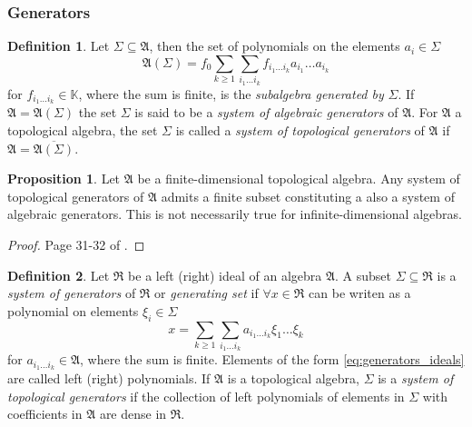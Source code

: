 \documentclass{article}
\theoremstyle{definition}
\newtheorem{definition}{Definition}
\newtheorem{proposition}{Proposition}
\begin{document}
\subsubsection{Generators}

\begin{definition}
    Let $\Sigma \subseteq \mathfrak{A}$, then the set of polynomials on the elements $a_i \in \Sigma$
    \begin{equation}
        \label{eq:generators_algebra}
        \mathfrak{A}(\Sigma) = f_0 \sum_{k \geq 1} \sum_{i_1 \dots i_k}
        f_{i_1\dots i_k} a_{i_1} \dots a_{i_k}
    \end{equation}
    for $f_{i_1 \dots i_k} \in \mathbb{K}$, where the sum is finite, is the \emph{subalgebra generated by} $\Sigma$. If $\mathfrak{A} = \mathfrak{A}(\Sigma)$ the set $\Sigma$ is said to be a \emph{system of algebraic generators} of $\mathfrak{A}$. For $\mathfrak{A}$ a topological algebra, the set $\Sigma$ is called a \emph{system of topological generators} of $\mathfrak{A}$ if $\mathfrak{A} = \overline{\mathfrak{A}(\Sigma)}$.
\end{definition}

\begin{proposition}
    Let $\mathfrak{A}$ be a finite-dimensional topological algebra. Any system of topological generators of $\mathfrak{A}$ admits a finite subset constituting a also a system of algebraic generators. This is not necessarily true for infinite-dimensional algebras.
\end{proposition}
\begin{proof}
    Page 31-32 of \cite{berezin_introduction_1987}.
\end{proof}

\begin{definition}
    Let $\mathfrak{R}$ be a left (right) ideal of an algebra $\mathfrak{A}$. A subset $\Sigma \subseteq \mathfrak{R}$ is a \emph{system of generators} of $\mathfrak{R}$ or \emph{generating set} if $\forall x \in \mathfrak{R}$ can be writen as a polynomial on elements $\xi_i \in \Sigma$
    \begin{equation}
        \label{eq:generators_ideals}
        x = \sum_{k \geq 1} \sum_{i_1 \dots i_k} a_{i_1 \dots i_k} \xi_1 \dots \xi_k
    \end{equation}
    for $a_{i_1 \dots i_k} \in \mathfrak{A}$, where the sum is finite. Elements of the form \eqref{eq:generators_ideals} are called left (right) polynomials. If $\mathfrak{A}$ is a topological algebra, $\Sigma$ is a \emph{system of topological generators} if the collection of left polynomials of elements in $\Sigma$ with coefficients in $\mathfrak{A}$ are dense in $\mathfrak{R}$.
\end{definition}
\end{document}
